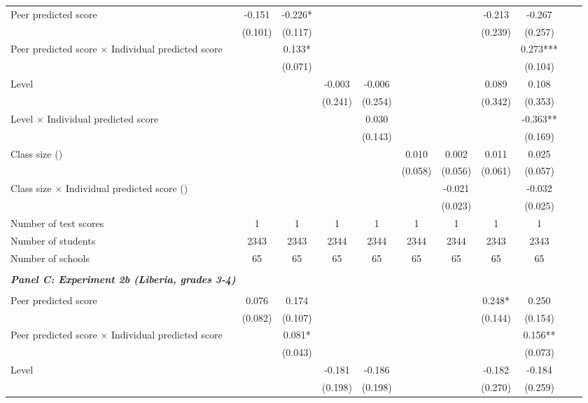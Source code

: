 \begin{center}
\begin{scriptsize}
\begin{threeparttable}
\begin{tabular} {@{} l l c c c c c c c c c c  @{}}
Peer predicted score &  & -0.151 & -0.226* &  &  &  &  & -0.213 & -0.267 \\
                 &  & (0.101) & (0.117) &  &  &  &  & (0.239) & (0.257) \\
Peer predicted score $\times$ Individual predicted score &  &  & 0.133* &  &  &  &  &  & 0.273*** \\
                 &  &  & (0.071) &  &  &  &  &  & (0.104) \\
Level &  &  &  & -0.003 & -0.006 &  &  & 0.089 & 0.108 \\
                 &  &  &  & (0.241) & (0.254) &  &  & (0.342) & (0.353) \\
Level $\times$ Individual predicted score &  &  &  &  & 0.030 &  &  &  & -0.363** \\
                 &  &  &  &  & (0.143) &  &  &  & (0.169) \\
Class size (\times 10) &  &  &  &  &  & 0.010 & 0.002 & 0.011 & 0.025 \\
                 &  &  &  &  &  & (0.058) & (0.056) & (0.061) & (0.057) \\
Class size $\times$ Individual predicted score (\times 10) &  &  &  &  &  &  & -0.021 &  & -0.032 \\
                 &  &  &  &  &  &  & (0.023) &  & (0.025) \\
\midrule
Number of test scores &  & 1 & 1 & 1 & 1 & 1 & 1 & 1 & 1 \\
Number of students &  & 2343 & 2343 & 2344 & 2344 & 2344 & 2344 & 2343 & 2343 \\
Number of schools &  & 65 & 65 & 65 & 65 & 65 & 65 & 65 & 65 \\
 \midrule
\\
\multicolumn{3}{l}{\textbf{\textit{Panel C: Experiment 2b (Liberia, grades 3-4)}}} \\
\\
Peer predicted score &  & 0.076 & 0.174 &  &  &  &  & 0.248* & 0.250 \\
                 &  & (0.082) & (0.107) &  &  &  &  & (0.144) & (0.154) \\
Peer predicted score $\times$ Individual predicted score &  &  & 0.081* &  &  &  &  &  & 0.156** \\
                 &  &  & (0.043) &  &  &  &  &  & (0.073) \\
Level &  &  &  & -0.181 & -0.186 &  &  & -0.182 & -0.184 \\
                 &  &  &  & (0.198) & (0.198) &  &  & (0.270) & (0.259) \\

\end{tabular}
\end{threeparttable}
\end{scriptsize}
\end{center}
